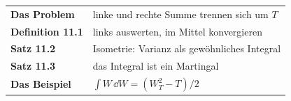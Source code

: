 \begin{merksatz}
\begin{center}
\renewcommand{\arraystretch}{1.5}
\begin{tabular}{@{}P{3.0cm}P{5.6cm}@{}}
\toprule
\textbf{Das Problem} & linke und rechte Summe trennen sich um $T$\\
\textbf{Definition 11.1} & links auswerten, im Mittel konvergieren\\
\textbf{Satz 11.2} & Isometrie: Varianz als gewöhnliches Integral\\
\textbf{Satz 11.3} & das Integral ist ein Martingal\\
\textbf{Das Beispiel} & $\int W\,\dd W = (W_T^{2}-T)/2$\\
\bottomrule
\end{tabular}
\end{center}

\begin{center}
\begin{minipage}{0.88\textwidth}
\end{minipage}
\end{center}
\end{merksatz}
